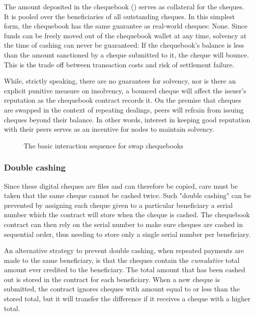 The amount deposited in the chequebook () serves as collateral for the cheques. It is pooled over the beneficiaries of all outstanding cheques. In this simplest form, the chequebook has the same guarantee as real-world cheques: None. Since funds can be freely moved out of the chequebook wallet at any time, solvency at the time of cashing can never be guaranteed: If the chequebook's balance is less than the amount sanctioned by a cheque submitted to it, the cheque will bounce. This is the trade off between transaction costs and risk of settlement failure.

While, strictly speaking, there are no guarantees for solvency, nor is there an explicit punitive measure on insolvency, a bounced cheque will affect the issuer's reputation as the chequebook contract records it. On the premise that cheques are swapped in the context of repeating dealings, peers will refrain from issuing cheques beyond their balance. In other words, interest in keeping good reputation with their peers serves as an incentive for nodes to maintain solvency.


\begin{figure}[htbp]
\centering

\caption[The basic interaction sequence for swap chequebooks]{The basic interaction sequence for swap chequebooks}
\label{fig:swap-chequebook}
\end{figure}


\subsubsection{Double cashing}

Since these digital cheques are files and can therefore be copied, care must be taken that the same cheque cannot be cashed twice. Such "double cashing" can be prevented by assigning each cheque given to a particular beneficiary a serial number which the contract will store when the cheque is cashed. The chequebook contract can then rely on the serial number to make sure cheques are cashed in sequential order, thus needing to store only a single serial number per beneficiary.

An alternative strategy to prevent double cashing, when repeated payments are made to the same beneficiary, is that the cheques contain the \emph{cumulative} total amount ever credited to the beneficiary. The total  amount that has been cashed out is stored in the contract for each beneficiary. When a new cheque is submitted, the contract ignores cheques with amount equal to or less than the stored total, but it will transfer the difference if it receives a cheque with a higher total.


